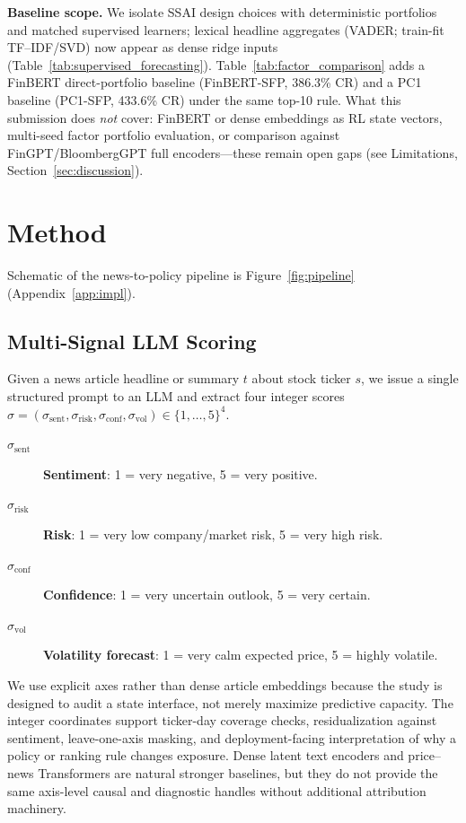 \documentclass{article}
\begin{document}
\textbf{Baseline scope.} We isolate SSAI design choices with deterministic portfolios and matched supervised learners; lexical headline aggregates (VADER; train-fit TF--IDF/SVD) now appear as dense ridge inputs (Table~\ref{tab:supervised_forecasting}). Table~\ref{tab:factor_comparison} adds a FinBERT direct-portfolio baseline (FinBERT-SFP, 386.3\% CR) and a PC1 baseline (PC1-SFP, 433.6\% CR) under the same top-10 rule. What this submission does \emph{not} cover: FinBERT or dense embeddings as RL state vectors, multi-seed factor portfolio evaluation, or comparison against FinGPT/BloombergGPT full encoders---these remain open gaps (see Limitations, Section~\ref{sec:discussion}).

\section{Method}
\label{sec:method}

Schematic of the news-to-policy pipeline is Figure~\ref{fig:pipeline} (Appendix~\ref{app:impl}).

\subsection{Multi-Signal LLM Scoring}
\label{sec:signals}

Given a news article headline or summary $t$ about stock ticker
$s$, we issue a single structured prompt to an LLM and extract four
integer scores $\sigma = (\sigma_\text{sent}, \sigma_\text{risk},
\sigma_\text{conf}, \sigma_\text{vol}) \in \{1,\ldots,5\}^4$.

\begin{description}
  \item[$\sigma_\text{sent}$] \textbf{Sentiment}: 1 = very negative, 5 = very positive.
  \item[$\sigma_\text{risk}$] \textbf{Risk}: 1 = very low company/market risk, 5 = very high risk.
  \item[$\sigma_\text{conf}$] \textbf{Confidence}: 1 = very uncertain outlook, 5 = very certain.
  \item[$\sigma_\text{vol}$] \textbf{Volatility forecast}: 1 = very calm expected price, 5 = highly volatile.
\end{description}

We use explicit axes rather than dense article embeddings because the study is designed to audit a state interface, not merely maximize predictive capacity.
The integer coordinates support ticker-day coverage checks, residualization against sentiment, leave-one-axis masking, and deployment-facing interpretation of why a policy or ranking rule changes exposure.
Dense latent text encoders and price--news Transformers are natural stronger baselines, but they do not provide the same axis-level causal and diagnostic handles without additional attribution machinery.
\end{document}
